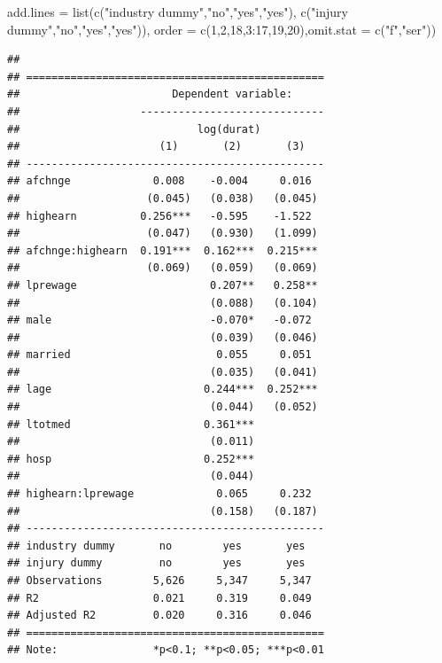 \documentclass[
  12pt,
]{book}
\newenvironment{Shaded}{\begin{snugshade}}{\end{snugshade}}
\newcommand{\AttributeTok}[1]{\textcolor[rgb]{0.77,0.63,0.00}{#1}}
\newcommand{\DecValTok}[1]{\textcolor[rgb]{0.00,0.00,0.81}{#1}}
\newcommand{\FunctionTok}[1]{\textcolor[rgb]{0.00,0.00,0.00}{#1}}
\newcommand{\NormalTok}[1]{#1}
\newcommand{\SpecialCharTok}[1]{\textcolor[rgb]{0.00,0.00,0.00}{#1}}
\newcommand{\StringTok}[1]{\textcolor[rgb]{0.31,0.60,0.02}{#1}}
\theoremstyle{definition}
\theoremstyle{definition}
\theoremstyle{definition}
\theoremstyle{definition}
\theoremstyle{remark}
\begin{document}
\begin{Shaded}
\begin{Highlighting}[]
                     \AttributeTok{add.lines =} \FunctionTok{list}\NormalTok{(}\FunctionTok{c}\NormalTok{(}\StringTok{"industry dummy"}\NormalTok{,}\StringTok{"no"}\NormalTok{,}\StringTok{"yes"}\NormalTok{,}\StringTok{"yes"}\NormalTok{),}
                                      \FunctionTok{c}\NormalTok{(}\StringTok{"injury dummy"}\NormalTok{,}\StringTok{"no"}\NormalTok{,}\StringTok{"yes"}\NormalTok{,}\StringTok{"yes"}\NormalTok{)),}
                     \AttributeTok{order =} \FunctionTok{c}\NormalTok{(}\DecValTok{1}\NormalTok{,}\DecValTok{2}\NormalTok{,}\DecValTok{18}\NormalTok{,}\DecValTok{3}\SpecialCharTok{:}\DecValTok{17}\NormalTok{,}\DecValTok{19}\NormalTok{,}\DecValTok{20}\NormalTok{),}\AttributeTok{omit.stat =} \FunctionTok{c}\NormalTok{(}\StringTok{"f"}\NormalTok{,}\StringTok{"ser"}\NormalTok{))}
\end{Highlighting}
\end{Shaded}

\begin{verbatim}
## 
## ===============================================
##                        Dependent variable:     
##                   -----------------------------
##                            log(durat)          
##                      (1)       (2)       (3)   
## -----------------------------------------------
## afchnge             0.008    -0.004     0.016  
##                    (0.045)   (0.038)   (0.045) 
## highearn          0.256***   -0.595    -1.522  
##                    (0.047)   (0.930)   (1.099) 
## afchnge:highearn  0.191***  0.162***  0.215*** 
##                    (0.069)   (0.059)   (0.069) 
## lprewage                     0.207**   0.258** 
##                              (0.088)   (0.104) 
## male                         -0.070*   -0.072  
##                              (0.039)   (0.046) 
## married                       0.055     0.051  
##                              (0.035)   (0.041) 
## lage                        0.244***  0.252*** 
##                              (0.044)   (0.052) 
## ltotmed                     0.361***           
##                              (0.011)           
## hosp                        0.252***           
##                              (0.044)           
## highearn:lprewage             0.065     0.232  
##                              (0.158)   (0.187) 
## -----------------------------------------------
## industry dummy       no        yes       yes   
## injury dummy         no        yes       yes   
## Observations        5,626     5,347     5,347  
## R2                  0.021     0.319     0.049  
## Adjusted R2         0.020     0.316     0.046  
## ===============================================
## Note:               *p<0.1; **p<0.05; ***p<0.01
\end{verbatim}
\end{document}
